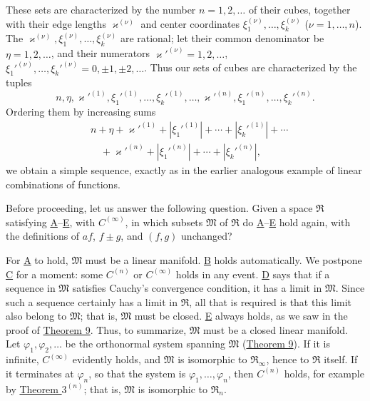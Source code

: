 \documentclass[fontsize=13pt,twoside,openany,headings=normal,parskip=false,bookmarkpackage=false,DIV=calc]{scrbook}
\begin{document}
These sets are characterized by the number $n=1,2,\ldots$ of their cubes, together with their edge lengths $\varkappa^{(\nu)}$ and center coordinates $\xi_1^{(\nu)},\ldots,\xi_k^{(\nu)}$ ($\nu=1,\ldots,n$). The $\varkappa^{(\nu)},\xi_1^{(\nu)},\ldots,\xi_k^{(\nu)}$ are rational; let their common denominator be $\eta=1,2,\ldots$, and their numerators $\varkappa'^{(\nu)}=1,2,\ldots$, $\xi_1'^{(\nu)},\ldots,\xi_k'^{(\nu)}=0,\pm1,\pm2,\ldots$. Thus our sets of cubes are characterized by the tuples
\[
n,\eta,\varkappa'^{(1)},\xi_1'^{(1)},\ldots,\xi_k'^{(1)},\ldots,\varkappa'^{(n)},\xi_1'^{(n)},\ldots,\xi_k'^{(n)}.
\]
Ordering them by increasing sums
\begin{align*}
&n+\eta+\varkappa'^{(1)}+|\xi_1'^{(1)}|+\cdots+|\xi_k'^{(1)}|+\cdots\\
&\quad+\varkappa'^{(n)}+|\xi_1'^{(n)}|+\cdots+|\xi_k'^{(n)}|,
\end{align*}
we obtain a simple sequence, exactly as in the earlier analogous example of linear combinations of functions.

Before proceeding, let us answer the following question. Given a space $\mathfrak{R}$ satisfying \hyperref[ax:II.A]{A}--\hyperref[ax:II.E]{E}, with \hyperref[ax:II.Cinfty]{$C^{(\infty)}$}, in which subsets $\mathfrak{M}$ of $\mathfrak{R}$ do \hyperref[ax:II.A]{A}--\hyperref[ax:II.E]{E} hold again, with the definitions of $af$, $f\pm g$, and $(f,g)$ unchanged?

\hypertarget{origpage-37}{}%
For \hyperref[ax:II.A]{A} to hold, $\mathfrak{M}$ must be a linear manifold. \hyperref[ax:II.B]{B} holds automatically. We postpone \hyperref[ax:II.Cn]{C} for a moment: some \hyperref[ax:II.Cn]{$C^{(n)}$} or \hyperref[ax:II.Cinfty]{$C^{(\infty)}$} holds in any event. \hyperref[ax:II.D]{D} says that if a sequence in $\mathfrak{M}$ satisfies Cauchy's convergence condition, it has a limit in $\mathfrak{M}$. Since such a sequence certainly has a limit in $\mathfrak{R}$, all that is required is that this limit also belong to $\mathfrak{M}$; that is, $\mathfrak{M}$ must be closed. \hyperref[ax:II.E]{E} always holds, as we saw in the proof of \hyperref[thm:II.9]{Theorem 9}. Thus, to summarize, $\mathfrak{M}$ must be a closed linear manifold. Let $\varphi_1,\varphi_2,\ldots$ be the orthonormal system spanning $\mathfrak{M}$ (\hyperref[thm:II.9]{Theorem 9}). If it is infinite, \hyperref[ax:II.Cinfty]{$C^{(\infty)}$} evidently holds, and $\mathfrak{M}$ is isomorphic to $\mathfrak{R}_\infty$, hence to $\mathfrak{R}$ itself. If it terminates at $\varphi_n$, so that the system is $\varphi_1,\ldots,\varphi_n$, then \hyperref[ax:II.Cn]{$C^{(n)}$} holds, for example by \hyperref[thm:II.3n]{Theorem $3^{(n)}$}; that is, $\mathfrak{M}$ is isomorphic to $\mathfrak{R}_n$.
\end{document}
